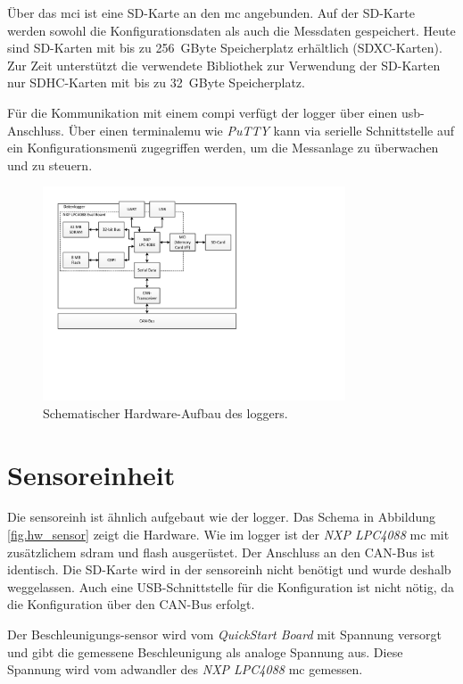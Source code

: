 Über das \gls{mci} ist eine SD-Karte an den \gls{mc} angebunden. Auf der SD-Karte werden sowohl die Konfigurationsdaten als auch die Messdaten gespeichert. Heute sind SD-Karten mit bis zu 256~GByte Speicherplatz erhältlich (SDXC-Karten). Zur Zeit unterstützt die verwendete Bibliothek zur Verwendung der SD-Karten nur SDHC-Karten mit bis zu 32~GByte Speicherplatz. 

Für die Kommunikation mit einem \gls{compi} verfügt der \gls{logger} über einen \gls{usb}-Anschluss. Über einen \gls{terminalemu} wie \emph{PuTTY} kann via serielle Schnittstelle auf ein Konfigurationsmenü zugegriffen werden, um die Messanlage zu überwachen und zu steuern.

\begin{figure}
	\centering
		\includegraphics[width=0.8\textwidth]{images/visio/hardware_logger.pdf}
	\caption{Schematischer Hardware-Aufbau des \gls{logger}s.}
	\label{fig.hw_logger}
\end{figure}



\section{Sensoreinheit}
Die \gls{sensoreinh} ist ähnlich aufgebaut wie der \gls{logger}. Das Schema in Abbildung \ref{fig.hw_sensor} zeigt die Hardware. Wie im \gls{logger} ist der \emph{NXP LPC4088} \gls{mc} mit zusätzlichem \gls{sdram} und \gls{flash} ausgerüstet. Der Anschluss an den CAN-Bus ist identisch. Die SD-Karte wird in der \gls{sensoreinh} nicht benötigt und wurde deshalb weggelassen. Auch eine USB-Schnittstelle für die Konfiguration ist nicht nötig, da die Konfiguration über den CAN-Bus erfolgt.

Der Beschleunigungs-\gls{sensor} wird vom \emph{QuickStart Board} mit Spannung versorgt und gibt die gemessene Beschleunigung als analoge Spannung aus. Diese Spannung wird vom \gls{adwandler} des \emph{NXP LPC4088} \gls{mc} gemessen.


